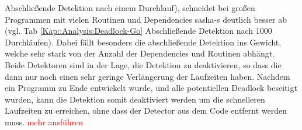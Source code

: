 Abschließende Detektion nach einem Durchlauf), schneidet bei großen Programmen 
mit vielen Routinen und Dependencies sasha-s deutlich besser ab (vgl. Tab \ref{Kap::Analysis:Deadlock-Go}
Abschließende Detektion nach 1000 Durchläufen). Dabei fällt besonders 
die abschließende Detektion ins Gewicht, welche sehr stark von der Anzahl der 
Dependencies und Routinen abhängt.\\
Beide Detektoren sind in der Lage, die Detektion zu deaktivieren, so dass die 
dann nur noch 
einen sehr geringe Verlängerung der Laufzeiten haben. Nachdem ein Programm 
zu Ende entwickelt wurde, und alle potentiellen Deadlock beseitigt wurden, 
kann die Detektion somit deaktiviert werden um die schnelleren Laufzeiten zu erreichen,
ohne dass der Detector aus dem Code entfernt werden muss.
\textcolor{red}{mehr ausführen}
 


